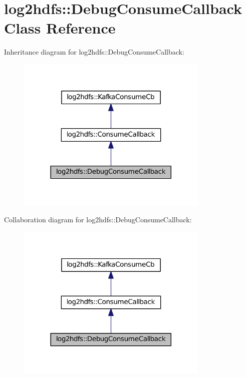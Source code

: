 \hypertarget{classlog2hdfs_1_1DebugConsumeCallback}{}\section{log2hdfs\+:\+:Debug\+Consume\+Callback Class Reference}
\label{classlog2hdfs_1_1DebugConsumeCallback}


Inheritance diagram for log2hdfs\+:\+:Debug\+Consume\+Callback\+:
\nopagebreak
\begin{figure}[H]
\begin{center}
\leavevmode
\includegraphics[width=260pt]{classlog2hdfs_1_1DebugConsumeCallback__inherit__graph}
\end{center}
\end{figure}


Collaboration diagram for log2hdfs\+:\+:Debug\+Consume\+Callback\+:
\nopagebreak
\begin{figure}[H]
\begin{center}
\leavevmode
\includegraphics[width=260pt]{classlog2hdfs_1_1DebugConsumeCallback__coll__graph}
\end{center}
\end{figure}
